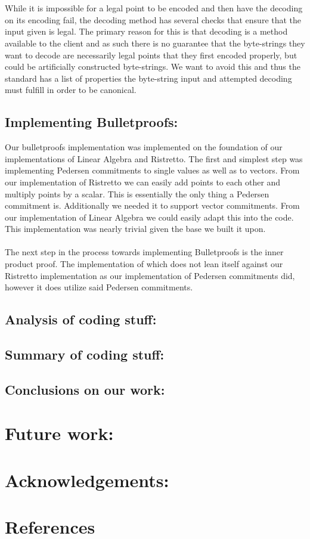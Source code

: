 \documentclass{article}
\begin{document}
\\\\
While it is impossible for a legal point to be encoded and then have the decoding on its encoding fail, the decoding method has several checks that ensure that the input given is legal. The primary reason for this is that decoding is a method available to the client and as such there is no guarantee that the byte-strings they want to decode are necessarily legal points that they first encoded properly, but could be artificially constructed byte-strings. We want to avoid this and thus the standard has a list of properties the byte-string input and attempted decoding must fulfill in order to be canonical. 

\subsection{Implementing Bulletproofs:}

Our bulletproofs implementation was implemented on the foundation of our implementations of Linear Algebra and Ristretto. The first and simplest step was implementing Pedersen commitments to single values as well as to vectors. From our implementation of Ristretto we can easily add points to each other and multiply points by a scalar. This is essentially the only thing a Pedersen commitment is. Additionally we needed it to support vector commitments. From our implementation of Linear Algebra we could easily adapt this into the code. This implementation was nearly trivial given the base we built it upon.
\\\\
The next step in the process towards implementing Bulletproofs is the inner product proof. The implementation of which does not lean itself against our Ristretto implementation as our implementation of Pedersen commitments did, however it does utilize said Pedersen commitments. 

\subsection{Analysis of coding stuff:}

\subsection{Summary of coding stuff:}

\subsection{Conclusions on our work:}

\section{Future work:}

\section{Acknowledgements:}


\section{References}
\printbibliography
\end{document}
